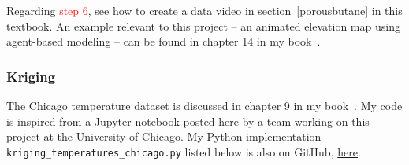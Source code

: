 \documentclass[oneside,10pt]{book}
\begin{document}
\noindent Regarding \textcolor{red}{step 6}, see how to create a data video in section~\ref{porousbutane} in this textbook.  An 
 example relevant to this project -- an animated elevation map using 
\textcolor{index}{agent-based modeling} -- can be found in chapter 14 in my book~\cite{vgelsevier}.








\subsubsection{Kriging}\label{gtifasw}

The Chicago temperature dataset is discussed in chapter 9 in my book~\cite{vgelsevier}.
My code is inspired from a Jupyter notebook posted
 \href{https://cybergisxhub.cigi.illinois.edu/notebook/spatial-interpolation/}{here} by a team working on this project at the University of Chicago.
My Python implementation \texttt{kriging\_temperatures\_chicago.py} listed below is also on GitHub,
 \href{https://github.com/VincentGranville/Statistical-Optimization/blob/main/kriging_temperatures_chicago.py}{here}.\vspace{1ex}
\end{document}
